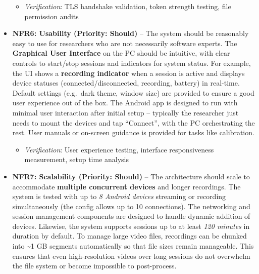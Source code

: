 \documentclass[12pt,a4paper]{article}
\begin{document}
\begin{itemize}
  \begin{itemize}
  \tightlist
  \item
    \emph{Verification}: TLS handshake validation, token strength testing, file permission audits
  \end{itemize}
\item
  \textbf{NFR6: Usability (Priority: Should)} -- The system should be reasonably easy to use for researchers who are not necessarily software experts. The \textbf{Graphical User Interface} on the PC should be intuitive, with clear controls to start/stop sessions and indicators for system status. For example, the UI shows a \textbf{recording indicator} when a session is active and displays device statuses (connected/disconnected, recording, battery) in real-time. Default settings (e.g.~dark theme, window size) are provided to ensure a good user experience out of the box. The Android app is designed to run with minimal user interaction after initial setup -- typically the researcher just needs to mount the devices and tap ``Connect'', with the PC orchestrating the rest. User manuals or on-screen guidance is provided for tasks like calibration.

  \begin{itemize}
  \tightlist
  \item
    \emph{Verification}: User experience testing, interface responsiveness measurement, setup time analysis
  \end{itemize}
\item
  \textbf{NFR7: Scalability (Priority: Should)} -- The architecture should scale to accommodate \textbf{multiple concurrent devices} and longer recordings. The system is tested with up to \emph{8 Android devices} streaming or recording simultaneously (the config allows up to 10 connections). The networking and session management components are designed to handle dynamic addition of devices. Likewise, the system supports sessions up to at least \emph{120 minutes} in duration by default. To manage large video files, recordings can be chunked into \textasciitilde1 GB segments automatically so that file sizes remain manageable. This ensures that even high-resolution videos over long sessions do not overwhelm the file system or become impossible to post-process.


\end{itemize}
\end{document}
